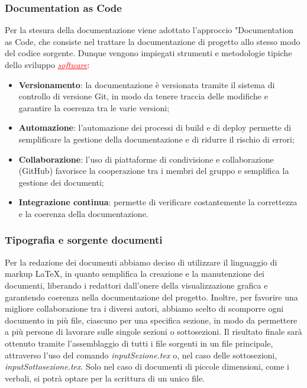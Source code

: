 \subsubsection{Documentation as Code}
Per la stesura della documentazione viene adottato l'approccio "Documentation as Code, che consiste nel trattare la documentazione di progetto
allo stesso modo del codice sorgente. Dunque vengono impiegati strumenti e metodologie tipiche dello sviluppo \textcolor{red}{\uline{\textit{software}}}:
\begin{itemize}
    \item \textbf{Versionamento}: la documentazione è versionata tramite il sistema di controllo di versione Git, in modo da tenere traccia 
    delle modifiche e garantire la coerenza tra le varie versioni;
    \item \textbf{Automazione}: l'automazione dei processi di build e di deploy permette di semplificare la gestione della documentazione e 
    di ridurre il rischio di errori;
    \item \textbf{Collaborazione}: l'uso di piattaforme di condivisione e collaborazione (GitHub) favorisce la cooperazione tra i membri 
    del gruppo e semplifica la gestione dei documenti;
    \item \textbf{Integrazione continua}: permette di verificare costantemente la correttezza e la coerenza della documentazione.
\end{itemize} 

\subsubsection{Tipografia e sorgente documenti}
Per la redazione dei documenti abbiamo deciso di utilizzare il linguaggio di markup \LaTeX{}, in quanto semplifica la creazione e la manutenzione
dei documenti, liberando i redattori dall'onere della visualizzazione grafica e garantendo coerenza nella documentazione del progetto.
Inoltre, per favorire una migliore collaborazione tra i diversi autori, abbiamo scelto di scomporre ogni documento in più file,
ciascuno per una specifica sezione, in modo da permettere a più persone di lavorare sulle singole sezioni o sottosezioni.
Il risultato finale sarà ottenuto tramite l'assemblaggio di tutti i file sorgenti in un file principale, attraverso l'uso del comando 
\textit{input{Sezione.tex}} o, nel caso delle sottosezioni, \textit{input{Sottosezione.tex}}.
Solo nel caso di documenti di piccole dimensioni, come i verbali, si potrà optare per la scrittura di un unico file. 


